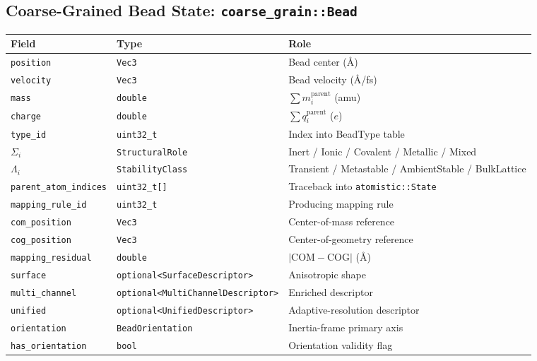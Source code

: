 \documentclass[11pt,a4paper]{article}
\begin{document}
\subsection{Coarse-Grained Bead State: \texttt{coarse\_grain::Bead}}

\begin{center}
\begin{tabular}{lll}
\toprule
Field & Type & Role \\
\midrule
\texttt{position}          & \texttt{Vec3}                    & Bead center (\AA) \\
\texttt{velocity}          & \texttt{Vec3}                    & Bead velocity (\AA/fs) \\
\texttt{mass}              & \texttt{double}                  & $\sum m_i^{\mathrm{parent}}$ (amu) \\
\texttt{charge}            & \texttt{double}                  & $\sum q_i^{\mathrm{parent}}$ ($e$) \\
\texttt{type\_id}          & \texttt{uint32\_t}               & Index into BeadType table \\
$\Sigma_i$ & \texttt{StructuralRole}          & Inert / Ionic / Covalent / Metallic / Mixed \\
$\Lambda_i$ & \texttt{StabilityClass}         & Transient / Metastable / AmbientStable / BulkLattice \\
\texttt{parent\_atom\_indices} & \texttt{uint32\_t[]}         & Traceback into \texttt{atomistic::State} \\
\texttt{mapping\_rule\_id} & \texttt{uint32\_t}               & Producing mapping rule \\
\texttt{com\_position}     & \texttt{Vec3}                    & Center-of-mass reference \\
\texttt{cog\_position}     & \texttt{Vec3}                    & Center-of-geometry reference \\
\texttt{mapping\_residual} & \texttt{double}                  & $|\mathrm{COM} - \mathrm{COG}|$ (\AA) \\
\texttt{surface}           & \texttt{optional<SurfaceDescriptor>}   & Anisotropic shape \\
\texttt{multi\_channel}    & \texttt{optional<MultiChannelDescriptor>} & Enriched descriptor \\
\texttt{unified}           & \texttt{optional<UnifiedDescriptor>}  & Adaptive-resolution descriptor \\
\texttt{orientation}       & \texttt{BeadOrientation}         & Inertia-frame primary axis \\
\texttt{has\_orientation}  & \texttt{bool}                    & Orientation validity flag \\
\bottomrule
\end{tabular}
\end{center}
\end{document}
